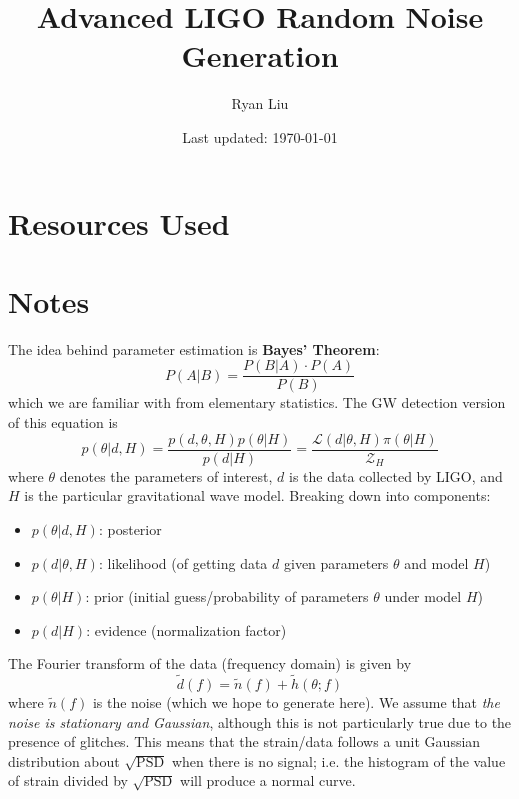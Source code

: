 \documentclass{article}
\title{Advanced LIGO Random Noise Generation}
\author{Ryan Liu}
\date{Last updated: \today}
\newcommand{\lag}{\mathcal{L}}
\begin{document}
\maketitle

\section{Resources Used}



\section{Notes}

The idea behind parameter estimation is \textbf{Bayes' Theorem}:
\begin{equation}
    P (A | B) = \frac{P (B | A) \cdot P (A)}{P(B)}
\end{equation}
which we are familiar with from elementary statistics. The GW detection version of this equation is 
\begin{equation}
    p(\theta | d,H) = \frac{p(d,\theta, H) p(\theta | H)}{p(d|H)} = \frac{\lag(d | \theta, H) \pi(\theta | H)}{\mathcal{Z}_H}
\end{equation}
where $\theta$ denotes the parameters of interest, $d$ is the data collected by LIGO, and $H$ is the particular gravitational wave model. Breaking down into components: 
\begin{itemize}
    \setlength{\itemsep}{0pt}
    \item $p(\theta |d,H)$: posterior 
    \item $p(d|\theta, H)$: likelihood (of getting data $d$ given parameters $\theta$ and model $H$)
    \item $p(\theta | H)$: prior (initial guess/probability of parameters $\theta$ under model $H$)
    \item $p(d | H)$: evidence (normalization factor)
\end{itemize}
The Fourier transform of the data (frequency domain) is given by 
\begin{equation}
    \tilde{d}(f) = \tilde{n}(f) + \tilde{h}(\theta; f)
\end{equation}
where $\tilde{n}(f)$ is the noise (which we hope to generate here). We assume that \textit{the noise is stationary and Gaussian}, although this is not particularly true due to the presence of glitches. This means that the strain/data follows a unit Gaussian distribution about $\sqrt{\text{PSD}}$ when there is no signal; i.e. the histogram of the value of strain divided by $\sqrt{\text{PSD}}$ will produce a normal curve. \\
\end{document}
